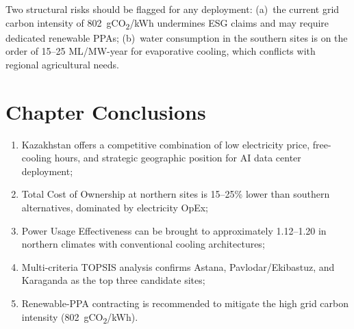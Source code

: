 Two structural risks should be flagged for any deployment: (a)~the current grid carbon intensity of 802~gCO\textsubscript{2}/kWh undermines ESG claims and may require dedicated renewable PPAs; (b)~water consumption in the southern sites is on the order of 15--25 ML/MW-year for evaporative cooling, which conflicts with regional agricultural needs.

\section{Chapter Conclusions}
\label{sec:aidc_conclusions}

\begin{enumerate}
    \item Kazakhstan offers a competitive combination of low electricity price, free-cooling hours, and strategic geographic position for AI data center deployment;
    \item Total Cost of Ownership at northern sites is 15--25\% lower than southern alternatives, dominated by electricity OpEx;
    \item Power Usage Effectiveness can be brought to approximately 1.12--1.20 in northern climates with conventional cooling architectures;
    \item Multi-criteria TOPSIS analysis confirms Astana, Pavlodar/Ekibastuz, and Karaganda as the top three candidate sites;
    \item Renewable-PPA contracting is recommended to mitigate the high grid carbon intensity (802~gCO\textsubscript{2}/kWh).
\end{enumerate}
